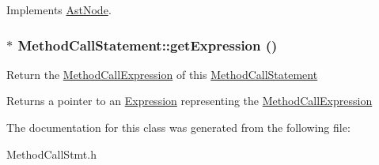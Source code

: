 Implements \hyperlink{classAstNode_a67b2d6ce1262da2954fb4db255759fb3}{AstNode}.\hypertarget{classMethodCallStatement_ab19af10f9dd979693f1714baf6f6e10f}{
\subsubsection[{getExpression}]{$\ast$ MethodCallStatement::getExpression ()}}
\label{classMethodCallStatement_ab19af10f9dd979693f1714baf6f6e10f}
Return the \hyperlink{classMethodCallExpression}{MethodCallExpression} of this \hyperlink{classMethodCallStatement}{MethodCallStatement}

\begin{DoxyReturn}{Returns}
a pointer to an \hyperlink{classExpression}{Expression} representing the \hyperlink{classMethodCallExpression}{MethodCallExpression} 
\end{DoxyReturn}


The documentation for this class was generated from the following file:\begin{DoxyCompactItemize}
\item 
MethodCallStmt.h\end{DoxyCompactItemize}
